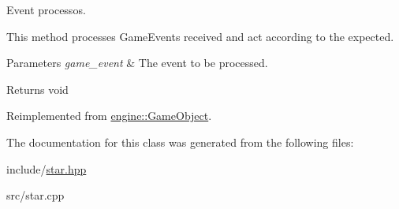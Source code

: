Event processos. 

This method processes Game\+Events received and act according to the expected.


\begin{DoxyParams}{Parameters}
{\em game\+\_\+event} & The event to be processed.\\
\hline
\end{DoxyParams}
\begin{DoxyReturn}{Returns}
void 
\end{DoxyReturn}


Reimplemented from \hyperlink{classengine_1_1_game_object}{engine\+::\+Game\+Object}.



The documentation for this class was generated from the following files\+:\begin{DoxyCompactItemize}
\item 
include/\hyperlink{star_8hpp}{star.\+hpp}\item 
src/star.\+cpp\end{DoxyCompactItemize}
